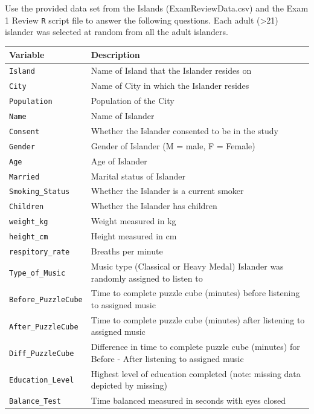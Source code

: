\documentclass[
]{report}
\begin{document}
Use the provided data set from the Islands (ExamReviewData.csv) and the Exam 1 Review \texttt{R} script file to answer the following questions. Each adult (\textgreater21) islander was selected at random from all the adult islanders.

\begin{longtable}[]{@{}
  >{\raggedright\arraybackslash}p{}
  >{\raggedright\arraybackslash}p{}@{}}
\toprule
\textbf{Variable} & \textbf{Description} \\
\midrule
\endhead
\texttt{Island} & Name of Island that the Islander resides on \\
\texttt{City} & Name of City in which the Islander resides \\
\texttt{Population} & Population of the City \\
\texttt{Name} & Name of Islander \\
\texttt{Consent} & Whether the Islander consented to be in the study \\
\texttt{Gender} & Gender of Islander (M = male, F = Female) \\
\texttt{Age} & Age of Islander \\
\texttt{Married} & Marital status of Islander \\
\texttt{Smoking\_Status} & Whether the Islander is a current smoker \\
\texttt{Children} & Whether the Islander has children \\
\texttt{weight\_kg} & Weight measured in kg \\
\texttt{height\_cm} & Height measured in cm \\
\texttt{respitory\_rate} & Breaths per minute \\
\texttt{Type\_of\_Music} & Music type (Classical or Heavy Medal) Islander was randomly assigned to listen to \\
\texttt{Before\_PuzzleCube} & Time to complete puzzle cube (minutes) before listening to assigned music \\
\texttt{After\_PuzzleCube} & Time to complete puzzle cube (minutes) after listening to assigned music \\
\texttt{Diff\_PuzzleCube} & Difference in time to complete puzzle cube (minutes) for Before - After listening to assigned music \\
\texttt{Education\_Level} & Highest level of education completed (note: missing data depicted by missing) \\
\texttt{Balance\_Test} & Time balanced measured in seconds with eyes closed \\

\end{longtable}
\end{document}
